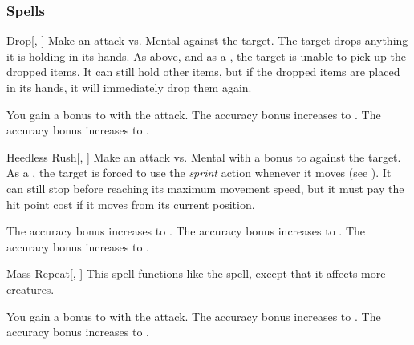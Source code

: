 \subsubsection{Spells}


\lowercase{\hypertarget{spell:Drop}{}}\label{spell:Drop}
\begin{freeability}[Rank 1]{\hypertarget{spell:Drop}{Drop}}[, ]
Make an attack vs. Mental against the target.
\hit The target drops anything it is holding in its hands.
\crit As above, and as a , the target is unable to pick up the dropped items.
It can still hold other items, but if the dropped items are placed in its hands, it will immediately drop them again.

\rankline
{} You gain a  bonus to  with the attack.
 The accuracy bonus increases to .
 The accuracy bonus increases to .

\end{freeability}
\vspace{0.25em}



\lowercase{\hypertarget{spell:Heedless Rush}{}}\label{spell:Heedless Rush}
\begin{freeability}[Rank 1]{\hypertarget{spell:Heedless Rush}{Heedless Rush}}[, ]
Make an attack vs. Mental with a  bonus to  against the target.
\hit As a , the target is forced to use the \textit{sprint} action whenever it moves (see ).
It can still stop before reaching its maximum movement speed, but it must pay the hit point cost if it moves from its current position.

\rankline
{} The accuracy bonus increases to .
 The accuracy bonus increases to .
 The accuracy bonus increases to .

\end{freeability}
\vspace{0.25em}



\lowercase{\hypertarget{spell:Mass Repeat}{}}\label{spell:Mass Repeat}
\begin{freeability}[Rank 1]{\hypertarget{spell:Mass Repeat}{Mass Repeat}}[, ]
This spell functions like the  spell, except that it affects more creatures.

\rankline
{} You gain a  bonus to  with the attack.
 The accuracy bonus increases to .
 The accuracy bonus increases to .

\end{freeability}
\vspace{0.25em}



